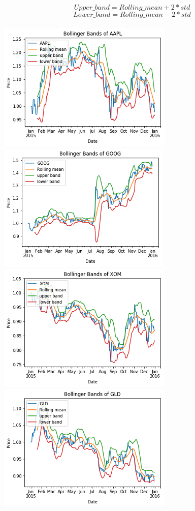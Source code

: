 \documentclass[11pt]{article}
\makeatletter
\def\maxwidth{\ifdim\Gin@nat@width>\linewidth\linewidth
    \else\Gin@nat@width\fi}
\let\Oldincludegraphics\includegraphics
\renewcommand{\includegraphics}[1]{\Oldincludegraphics[width=.8\maxwidth]{#1}}
\makeatother
\begin{document}
\[ Upper\_band = Rolling\_mean + 2*std \]
\[ Lower\_band = Rolling\_mean - 2*std \] \\
\includegraphics{./figures/4.jpg} \includegraphics{./figures/5.jpg} \\
\includegraphics{./figures/6.jpg} \includegraphics{./figures/7.jpg}
\end{document}
